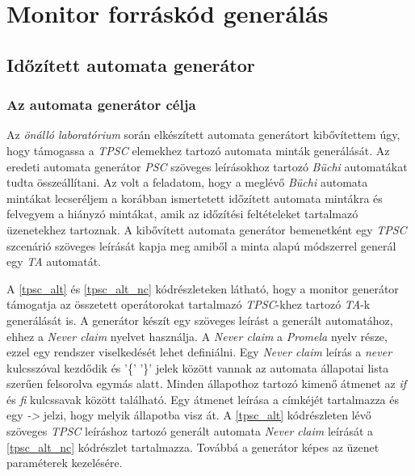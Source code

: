 \chapter{Monitor forráskód generálás}\section{Időzített automata generátor}

\subsection{Az automata generátor célja}

Az \textit{önálló laboratórium} során elkészített automata generátort kibővítettem úgy, hogy támogassa a \textit{TPSC} elemekhez tartozó automata minták generálását.
Az eredeti automata generátor \textit{PSC} szöveges leírásokhoz tartozó \textit{Büchi} automatákat tudta összeállítani.
Az volt a feladatom, hogy a meglévő \textit{Büchi} automata mintákat lecseréljem a korábban ismertetett időzített automata mintákra és felvegyem a hiányzó mintákat, amik az időzítési feltételeket tartalmazó üzenetekhez tartoznak.
A kibővített automata generátor bemenetként egy \textit{TPSC} szcenárió szöveges leírását kapja meg amiből a minta alapú módszerrel generál egy \textit{TA} automatát.

A \ref{tpsc_alt} és \ref{tpsc_alt_nc} kódrészleteken látható, hogy a monitor generátor támogatja az összetett operátorokat tartalmazó \textit{TPSC}-khez tartozó \textit{TA}-k generálását is.
A generátor készít egy szöveges leírást a generált automatához, ehhez a \textit{Never claim} nyelvet használja.
A \textit{Never claim} \cite{NeverClaim} a \textit{Promela} nyelv része, ezzel egy rendszer viselkedését lehet definiálni.
Egy \textit{Never claim} leírás a \textit{never} kulcsszóval kezdődik és '\{' '\}' jelek között vannak az automata állapotai lista szerűen felsorolva egymás alatt.
Minden állapothoz tartozó kimenő átmenet az \textit{if} és \textit{fi} kulcssavak között található.
Egy átmenet leírása a címkéjét tartalmazza és egy \textit{->} jelzi, hogy melyik állapotba visz át.
A \ref{tpsc_alt} kódrészleten lévő szöveges \textit{TPSC} leíráshoz tartozó generált automata \textit{Never claim} leírását a \ref{tpsc_alt_nc} kódrészlet tartalmazza.
Továbbá a generátor képes az üzenet paraméterek kezelésére.

